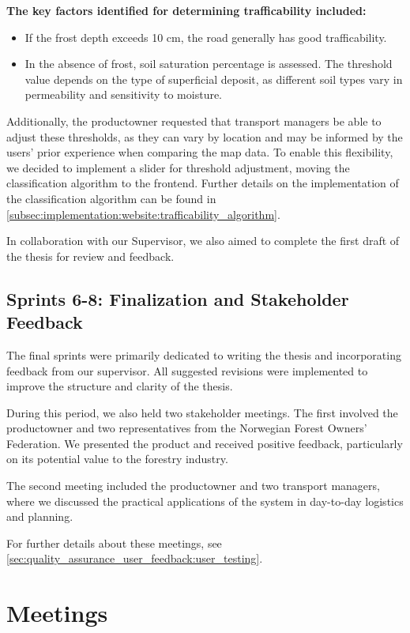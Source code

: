 \textbf{The key factors identified for determining trafficability included:}

\begin{itemize}
    \item If the frost depth exceeds 10 cm, the road generally has good trafficability.
    \item In the absence of frost, soil saturation percentage is assessed. The threshold value depends on the type of superficial deposit, as different soil types vary in permeability and sensitivity to moisture.
\end{itemize}

Additionally, the \gls{productowner} requested that transport managers be able to adjust these thresholds, as they can vary by location and may be informed by the users' prior experience when comparing the map data. To enable this flexibility, we decided to implement a slider for threshold adjustment, moving the classification algorithm to the frontend. Further details on the implementation of the classification algorithm can be found in \autoref{subsec:implementation:website:trafficability_algorithm}.

In collaboration with our Supervisor, we also aimed to complete the first draft of the thesis for review and feedback.

\subsection*{Sprints 6-8: Finalization and Stakeholder Feedback}

The final sprints were primarily dedicated to writing the thesis and incorporating feedback from our supervisor. All suggested revisions were implemented to improve the structure and clarity of the thesis.

During this period, we also held two stakeholder meetings. The first involved the \gls{productowner} and two representatives from the Norwegian Forest Owners' Federation. We presented the product and received positive feedback, particularly on its potential value to the forestry industry.

The second meeting included the \gls{productowner} and two transport managers, where we discussed the practical applications of the system in day-to-day logistics and planning.

For further details about these meetings, see \autoref{sec:quality_assurance_user_feedback:user_testing}.

\section{Meetings}\label{sec:devpro:meetings}

